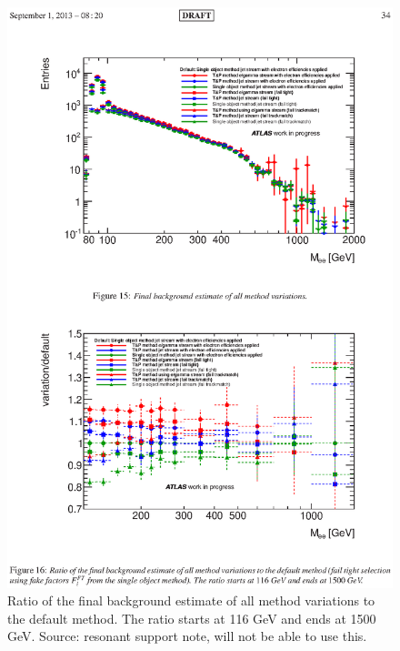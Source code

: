    \begin{figure}[h]
      \begin{center}
      \includegraphics[scale=1,trim={3cm 5.5cm 3cm 14cm},clip]{images/ff_bkg_variation.ps}
      \end{center}
   \caption{Ratio of the final background estimate of all method variations to the default method. The ratio starts at 116 GeV and ends at 1500 GeV. Source: resonant support note, will not be able to use this.}
   \label{fig:ff_bkg_variation}
   \end{figure}



\newpage




